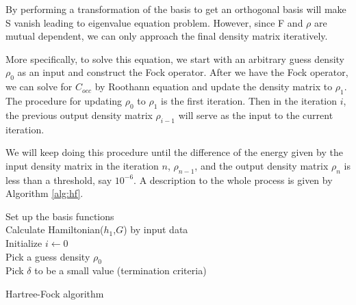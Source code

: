 \documentclass[twoside]{article}
\begin{document}

By performing a transformation of the basis to get an
orthogonal basis will make S vanish leading to eigenvalue
equation problem.
However, since F and $\rho$ are mutual dependent, we can only approach the final density matrix iteratively.

More specifically, to solve this equation, 
we start with an arbitrary guess density $\rho_0$ as an input and construct the Fock operator. 
After we have the Fock operator, we can solve for $C_{occ}$ by Roothann equation and update the density matrix to $\rho_1$. The procedure for updating $\rho_0$ to $\rho_1$ is the first iteration. Then in the iteration $i$, the previous output density matrix $\rho_{i-1}$ will serve as the input to the current iteration.

We will keep doing this procedure until the difference of the energy given by the input density matrix in the iteration $n$, $\rho_{n-1}$,  and the output density matrix $\rho_n$ is less than a threshold, say $10^{-6}$.  A description to the whole process is given by Algorithm \ref{alg:hf}.





\begin{algorithm}[htb]
 \label{alg:hf}
	Set up the basis functions\\
	Calculate Hamiltonian($h_1$,$G$) by input data  \\
	Initialize $i \leftarrow	 0$ \\	
	Pick a guess density $\rho_0$ \\
	Pick $\delta$ to be a small value (termination criteria) \\
 \caption{Hartree-Fock algorithm}
\end{algorithm}
\end{document}
